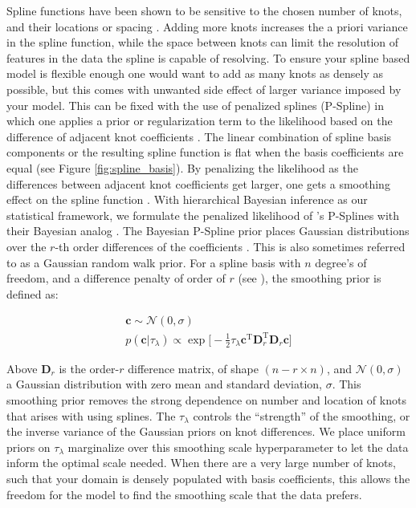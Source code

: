 Spline functions have been shown to be sensitive to the chosen number of knots, and their locations or spacing \citep{deBoor78}. 
Adding more knots increases the a priori variance in the spline function, while the space between knots can limit the 
resolution of features in the data the spline is capable of resolving. To ensure your spline based model is flexible enough 
one would want to add as many knots as densely as possible, but this comes with unwanted side effect of larger variance imposed by your model. 
This can be fixed with the use of penalized splines (P-Spline) in which one applies a prior or regularization term 
to the likelihood based on the difference of adjacent knot coefficients \citep{eilers2021practical}. The linear combination of spline basis components 
or the resulting spline function is flat when the basis coefficients are equal (see Figure \ref{fig:spline_basis}). By penalizing the likelihood as 
the differences between adjacent knot coefficients get larger, one gets a smoothing effect on the spline function \citep{eilers2021practical}. 
With hierarchical Bayesian inference as our statistical framework, we formulate the penalized likelihood of \citet{eilers2021practical}'s P-Splines with 
their Bayesian analog \citep{BayesianPSplines}. The Bayesian P-Spline prior places Gaussian distributions over the $r$-th order differences of the 
coefficients \citep{BayesianPSplines,Jullion2007RobustSO}. This is also sometimes referred to as a Gaussian random walk prior. 
For a spline basis with $n$ degree's of freedom, and a difference penalty of order of $r$ (see \citet{eilers2021practical}), 
the smoothing prior is defined as:

\begin{eqnarray}
\bm{c} \sim \mathcal{N}(0, \sigma) \\
p(\bm{c} | \tau_\lambda) \propto \exp \big[ -\frac{1}{2} \tau_\lambda \bm{c}^{\mathrm{T}} \bm{D}_{r}^{\mathrm{T}} \bm{D}_r \bm{c}  \big] 
\end{eqnarray}

\noindent Above $\bm{D}_r$ is the order-$r$ difference matrix, of shape $(n-r \times n)$, and $\mathcal{N}(0,\sigma)$ a Gaussian distribution with zero mean 
and standard deviation, $\sigma$. This smoothing prior removes the strong dependence on number and location of knots that arises with using splines. 
The $\tau_\lambda$ controls the ``strength'' of the smoothing, or the inverse variance of the Gaussian priors on knot differences. We 
place uniform priors on $\tau_\lambda$ marginalize over this smoothing scale hyperparameter to let the data inform the optimal scale needed.
When there are a very large number of knots, such that your domain is densely populated with basis coefficients, this allows the freedom for the model to find the smoothing 
scale that the data prefers. 

